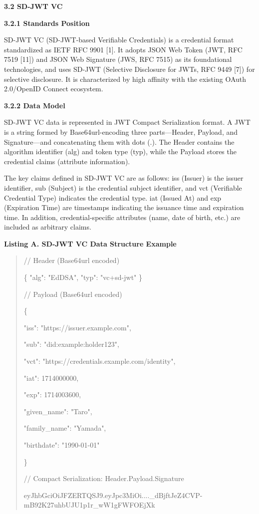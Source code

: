 \textbf{3.2 SD-JWT VC}

\textbf{3.2.1 Standards Position}

SD-JWT VC (SD-JWT-based Verifiable Credentials) is a credential format standardized as IETF RFC 9901 {[}1{]}. It adopts JSON Web Token (JWT, RFC 7519 {[}11{]}) and JSON Web Signature (JWS, RFC 7515) as its foundational technologies, and uses SD-JWT (Selective Disclosure for JWTs, RFC 9449 {[}7{]}) for selective disclosure. It is characterized by high affinity with the existing OAuth 2.0/OpenID Connect ecosystem.

\textbf{3.2.2 Data Model}

SD-JWT VC data is represented in JWT Compact Serialization format. A JWT is a string formed by Base64url-encoding three parts---Header, Payload, and Signature---and concatenating them with dots (.). The Header contains the algorithm identifier (alg) and token type (typ), while the Payload stores the credential claims (attribute information).

The key claims defined in SD-JWT VC are as follows: iss (Issuer) is the issuer identifier, sub (Subject) is the credential subject identifier, and vct (Verifiable Credential Type) indicates the credential type. iat (Issued At) and exp (Expiration Time) are timestamps indicating the issuance time and expiration time. In addition, credential-specific attributes (name, date of birth, etc.) are included as arbitrary claims.

\textbf{Listing A. SD-JWT VC Data Structure Example}

\begin{quote}
// Header (Base64url encoded)

\{ "alg": "EdDSA", "typ": "vc+sd-jwt" \}

// Payload (Base64url encoded)

\{

"iss": "https://issuer.example.com",

"sub": "did:example:holder123",

"vct": "https://credentials.example.com/identity",

"iat": 1714000000,

"exp": 1714003600,

"given\_name": "Taro",

"family\_name": "Yamada",

"birthdate": "1990-01-01"

\}

// Compact Serialization: Header.Payload.Signature

eyJhbGciOiJFZERTQSJ9.eyJpc3MiOi....\_dBjftJeZ4CVP-mB92K27uhbUJU1p1r\_wW1gFWFOEjXk
\end{quote}

